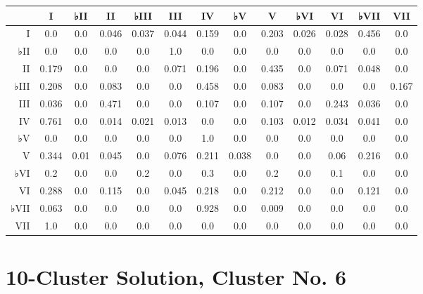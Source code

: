\begin{table}[htbp]
\begin{minipage}{\linewidth}
\setlength{\tymax}{0.5\linewidth}
\centering
\small
\begin{tabulary}{\textwidth}{@{}RCCCCCCCCCCCC@{}} \toprule
&I&♭II&II&♭III&III&IV&♭V&V&♭VI&VI&♭VII&VII\\
\midrule
I&0.0&0.0&0.046&0.037&0.044&0.159&0.0&0.203&0.026&0.028&0.456&0.0\\
♭II&0.0&0.0&0.0&0.0&1.0&0.0&0.0&0.0&0.0&0.0&0.0&0.0\\
II&0.179&0.0&0.0&0.0&0.071&0.196&0.0&0.435&0.0&0.071&0.048&0.0\\
♭III&0.208&0.0&0.083&0.0&0.0&0.458&0.0&0.083&0.0&0.0&0.0&0.167\\
III&0.036&0.0&0.471&0.0&0.0&0.107&0.0&0.107&0.0&0.243&0.036&0.0\\
IV&0.761&0.0&0.014&0.021&0.013&0.0&0.0&0.103&0.012&0.034&0.041&0.0\\
♭V&0.0&0.0&0.0&0.0&0.0&1.0&0.0&0.0&0.0&0.0&0.0&0.0\\
V&0.344&0.01&0.045&0.0&0.076&0.211&0.038&0.0&0.0&0.06&0.216&0.0\\
♭VI&0.2&0.0&0.0&0.2&0.0&0.3&0.0&0.2&0.0&0.1&0.0&0.0\\
VI&0.288&0.0&0.115&0.0&0.045&0.218&0.0&0.212&0.0&0.0&0.121&0.0\\
♭VII&0.063&0.0&0.0&0.0&0.0&0.928&0.0&0.009&0.0&0.0&0.0&0.0\\
VII&1.0&0.0&0.0&0.0&0.0&0.0&0.0&0.0&0.0&0.0&0.0&0.0\\

\bottomrule

\end{tabulary}
\end{minipage}
\end{table}

\section{10-Cluster Solution, Cluster No. 6}
\label{10-clustersolutionclusterno.6}

